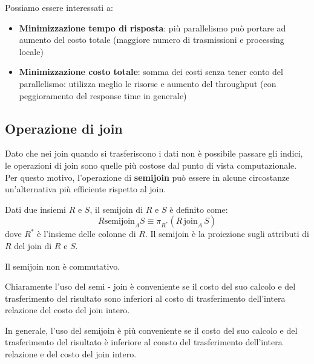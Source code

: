 Possiamo essere interessati a:
\begin{itemize}
    \item \textbf{Minimizzazione tempo di risposta}: più parallelismo può portare ad
          aumento del costo totale (maggiore numero di trasmissioni e
          processing locale)
    \item \textbf{Minimizzazione costo totale}: somma dei costi senza tener conto del
          parallelismo: utilizza meglio le risorse e aumento del throughput (con
          peggioramento del response time in generale)
\end{itemize}

\subsection{Operazione di join}
Dato che nei join quando si trasferiscono i dati non è possibile passare gli indici,
le operazioni di join sono quelle più costose dal punto di vista computazionale.
Per questo motivo, l'operazione di \textbf{semijoin} può essere in alcune circostanze
un'alternativa più efficiente rispetto al join.
\begin{definizione}
    Dati due insiemi $R$ e $S$, il semijoin di $R$ e $S$ è definito come:
    \begin{equation*}
        R \text{semijoin}_A S \equiv \pi_{R^\ast}(R \, \text{join}_A \, S)
    \end{equation*}
    dove $R^\ast$ è l'insieme delle colonne di $R$. Il semijoin è la proiezione
    sugli attributi di $R$ del join di $R$ e $S$.
\end{definizione}
\begin{nota}
    Il semijoin non è commutativo.
\end{nota}
Chiaramente l'uso del semi - join è conveniente se il costo del suo calcolo e
del trasferimento del risultato sono inferiori al costo di trasferimento
dell'intera relazione del costo del join intero.

In generale, l'uso del semijoin è più conveniente se il costo del suo calcolo e
del trasferimento del risultato è inferiore al consto del trasferimento
dell'intera relazione e del costo del join intero.

